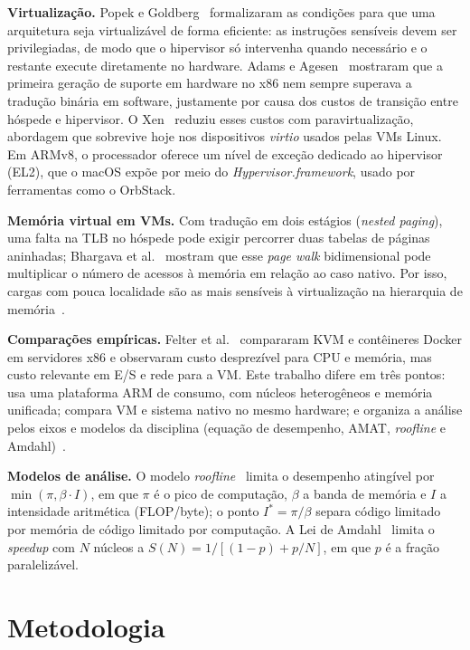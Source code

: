 \documentclass[12pt]{article}
\begin{document}
\textbf{Virtualização.} Popek e Goldberg~\cite{popek1974} formalizaram as
condições para que uma arquitetura seja virtualizável de forma eficiente: as
instruções sensíveis devem ser privilegiadas, de modo que o hipervisor só
intervenha quando necessário e o restante execute diretamente no hardware.
Adams e Agesen~\cite{adams2006} mostraram que a primeira geração de suporte em
hardware no x86 nem sempre superava a tradução binária em software, justamente
por causa dos custos de transição entre hóspede e hipervisor. O Xen~\cite{barham2003}
reduziu esses custos com paravirtualização, abordagem que sobrevive hoje nos
dispositivos \emph{virtio} usados pelas VMs Linux. Em ARMv8, o processador
oferece um nível de exceção dedicado ao hipervisor (EL2), que o macOS expõe por
meio do \emph{Hypervisor.framework}, usado por ferramentas como o OrbStack.

\textbf{Memória virtual em VMs.} Com tradução em dois estágios (\emph{nested
paging}), uma falta na TLB no hóspede pode exigir percorrer duas tabelas de
páginas aninhadas; Bhargava et al.~\cite{bhargava2008} mostram que esse
\emph{page walk} bidimensional pode multiplicar o número de acessos à memória
em relação ao caso nativo. Por isso, cargas com pouca localidade são as mais
sensíveis à virtualização na hierarquia de memória~\cite{drepper2007}.

\textbf{Comparações empíricas.} Felter et al.~\cite{felter2015} compararam KVM
e contêineres Docker em servidores x86 e observaram custo desprezível para CPU e
memória, mas custo relevante em E/S e rede para a VM. Este trabalho difere em
três pontos: usa uma plataforma ARM de consumo, com núcleos heterogêneos e
memória unificada; compara VM e sistema nativo no mesmo hardware; e organiza a
análise pelos eixos e modelos da disciplina (equação de desempenho, AMAT,
\emph{roofline} e Amdahl)~\cite{hennessy2017,patterson2016,gregg2020}.

\textbf{Modelos de análise.} O modelo \emph{roofline}~\cite{williams2009}
limita o desempenho atingível por $\min(\pi, \beta \cdot I)$, em que $\pi$ é o
pico de computação, $\beta$ a banda de memória e $I$ a intensidade aritmética
(FLOP/byte); o ponto $I^\ast = \pi/\beta$ separa código limitado por memória de
código limitado por computação. A Lei de Amdahl~\cite{amdahl1967} limita o
\emph{speedup} com $N$ núcleos a $S(N) = 1/[(1-p) + p/N]$, em que $p$ é a
fração paralelizável.

\section{Metodologia}
\end{document}
